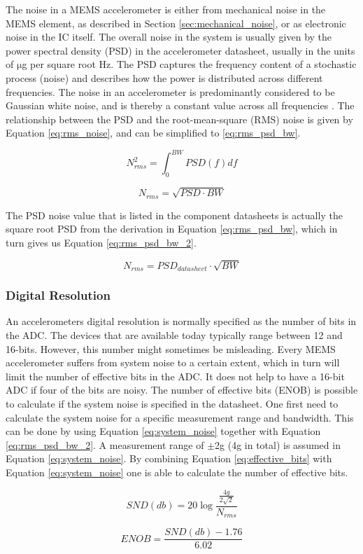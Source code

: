 The noise in a MEMS accelerometer is either from mechanical noise in the MEMS element, as described in Section \ref{sec:mechanical_noise}, or as electronic noise in the IC itself. The overall noise in the system is usually given by the power spectral density (PSD) in the accelerometer datasheet, usually in the units of $\si{\micro}$g per square root Hz. The PSD captures the frequency content of a stochastic process (noise) and describes how the power is distributed across different frequencies. The noise in an accelerometer is predominantly considered to be Gaussian white noise, and is thereby a constant value across all frequencies \cite{freescale_accel_guide}. The relationship between the PSD and the root-mean-square (RMS) noise is given by Equation \ref{eq:rms_noise}, and can be simplified to \ref{eq:rms_psd_bw}.

\begin{equation}
N^{2}_{rms}=\int_0^{BW}{PSD(f)df}
\label{eq:rms_noise}
\end{equation}

\begin{equation}
N_{rms}=\sqrt{PSD \cdot BW}
\label{eq:rms_psd_bw}
\end{equation}

The PSD noise value that is listed in the component datasheets is actually the square root PSD from the derivation in Equation \ref{eq:rms_psd_bw}, which in turn gives us Equation \ref{eq:rms_psd_bw_2}.

\begin{equation}
N_{rms}=PSD_{datasheet} \cdot \sqrt{BW}
\label{eq:rms_psd_bw_2}
\end{equation}

\subsubsection{Digital Resolution}

An accelerometers digital resolution is normally specified as the number of bits in the ADC. The devices that are available today typically range between 12 and 16-bits. However, this number might sometimes be misleading. Every MEMS accelerometer suffers from system noise to a certain extent, which in turn will limit the number of effective bits in the ADC. It does not help to have a 16-bit ADC if four of the bits are noisy. The number of effective bits (ENOB) is possible to calculate if the system noise is specified in the datasheet. One first need to calculate the system noise for a specific measurement range and bandwidth. This can be done by using Equation \ref{eq:system_noise} together with Equation \ref{eq:rms_psd_bw_2}. A measurement range of $\pm$2g (4g in total) is assumed in Equation \ref{eq:system_noise}. By combining Equation \ref{eq:effective_bits} with Equation \ref{eq:system_noise} one is able to calculate the number of effective bits. 

\begin{equation}
SND(db) = 20\log{\frac{\frac{4g}{2\sqrt{2}}}{N_{rms}}}
\label{eq:system_noise}
\end{equation}

\begin{equation}
ENOB = \frac{SND(db)-1.76}{6.02}
\label{eq:effective_bits}
\end{equation}